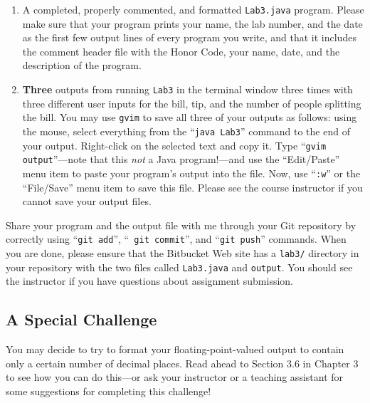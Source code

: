 \begin{enumerate}

        \item A completed, properly commented, and formatted {\tt Lab3.java} program. Please make sure that your program
          prints your name, the lab number, and the date as the first few output lines of every program you write, and
          that it includes the comment header file with the Honor Code, your name, date, and the description of the
          program.

        \item \textbf{Three} outputs from running {\tt Lab3} in the terminal window three times with three different
          user inputs for the bill, tip, and the number of people splitting the bill. You may use {\tt gvim} to save all
          three of your outputs as follows: using the mouse, select everything from the ``{\tt java Lab3}'' command to
          the end of your output.  Right-click on the selected text and copy it.  Type ``{\tt gvim output}''---note that
          this {\em not} a Java program!---and use the ``Edit/Paste'' menu item to paste your program's output into the
          file.  Now, use ``{\tt :w}'' or the ``File/Save'' menu item to save this file. Please see the course
          instructor if you cannot save your output files.

\end{enumerate}
\vspace{-0.1in}
Share your program and the output file with me through your Git repository by correctly using ``{\tt git add}'', ``{\tt
git commit}'', and ``{\tt git push}'' commands. When you are done, please ensure that the Bitbucket Web site has
a {\tt lab3/} directory in your repository with the two files called {\tt Lab3.java} and {\tt output}. You should see
the instructor if you have questions about assignment submission.

\vspace{-0.1in}
\subsection*{A Special Challenge}

You may decide to try to format your floating-point-valued output to contain only a certain number of decimal places.
Read ahead to Section 3.6 in Chapter 3 to see how you can do this---or ask your instructor or a teaching assistant for
some suggestions for completing this challenge!



